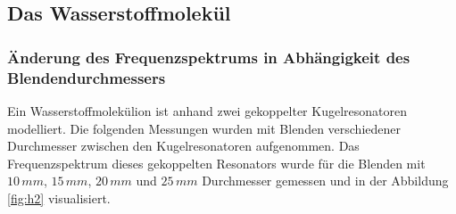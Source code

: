 \subsection{Das Wasserstoffmolekül}
\subsubsection{Änderung des Frequenzspektrums in Abhängigkeit des Blendendurchmessers}
\label{sec:h2peaks}
Ein Wasserstoffmolekülion ist anhand zwei gekoppelter Kugelresonatoren modelliert. Die folgenden Messungen wurden mit Blenden verschiedener Durchmesser zwischen den Kugelresonatoren 
aufgenommen. Das Frequenzspektrum dieses gekoppelten Resonators wurde für die Blenden mit $10\,mm$, $15\,mm$, $20\,mm$ und $25\,mm$ Durchmesser gemessen und in der Abbildung \ref{fig:h2} visualisiert. \\\\

